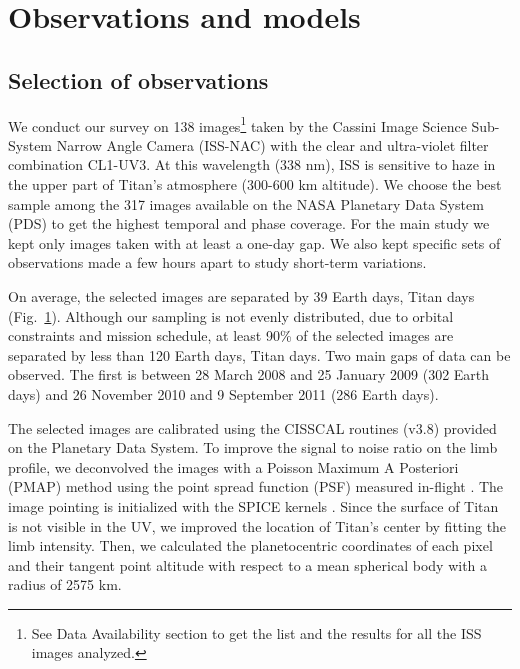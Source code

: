 \section{Observations and models}

\subsection{Selection of observations}
We conduct our survey on 138 images\footnote{See Data Availability section to get the list and the results for all the ISS images analyzed.}
taken by the Cassini Image Science Sub-System Narrow Angle Camera (ISS-NAC) with the
clear and ultra-violet filter combination CL1-UV3. At this wavelength (338 nm), ISS is sensitive to haze in the
upper part of Titan's atmosphere (300-600 km altitude). We choose the best sample among the 317 images available on the NASA Planetary Data System (PDS)
to get the highest temporal and phase coverage. For the main study we kept only images taken with at least a one-day gap.
We also kept specific sets of observations made a few hours apart to study short-term variations.

On average, the selected images are separated by 39 Earth days,  Titan days (Fig.~\ref{fig:img_sampling}).
Although our sampling is not evenly distributed, due to orbital constraints and mission schedule, at least 90\% of the selected
images are separated by less than 120 Earth days,  Titan days. Two main gaps of data can be observed.
The first is between 28 March 2008 and 25 January 2009 (302 Earth days) and 26 November 2010 and 9 September 2011 (286 Earth days).

\begin{figure}[ht!]
\caption{}
\label{fig:img_sampling}
\end{figure}

The selected images are calibrated using the CISSCAL routines (v3.8) provided on the Planetary Data System. To improve
the signal to noise ratio on the limb profile, we deconvolved the images with a Poisson Maximum A Posteriori
(PMAP) method using the point spread function (PSF) measured in-flight \citep{West2010, Knowles2020}.
The image pointing is
initialized with the SPICE kernels \citep{Acton1996, Annex2020}. Since the surface of Titan is not visible in the UV, we improved
the location of Titan's center by fitting the limb intensity. Then, we calculated the planetocentric coordinates of each
pixel and their tangent point altitude with respect to a mean spherical body with a radius of 2575 km.

